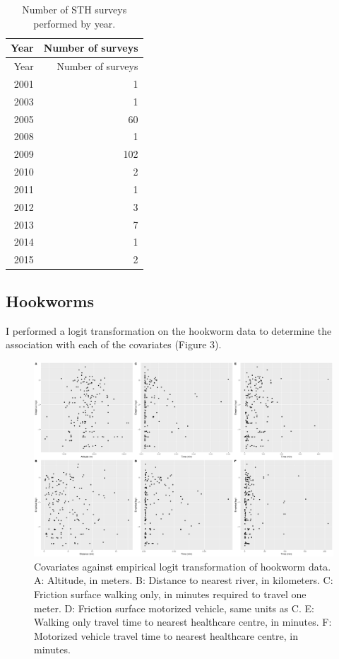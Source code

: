 \documentclass[
]{article}
\begin{document}
\begin{longtable}[]{@{}rr@{}}
\caption{Number of STH surveys performed by year.}\tabularnewline
\toprule
Year & Number of surveys \\
\midrule
\endfirsthead
\toprule
Year & Number of surveys \\
\midrule
\endhead
2001 & 1 \\
2003 & 1 \\
2005 & 60 \\
2008 & 1 \\
2009 & 102 \\
2010 & 2 \\
2011 & 1 \\
2012 & 3 \\
2013 & 7 \\
2014 & 1 \\
2015 & 2 \\
\bottomrule
\end{longtable}

\hypertarget{hookworms}{%
\subsection{Hookworms}\label{hookworms}}

I performed a logit transformation on the hookworm data to determine the
association with each of the covariates (Figure 3).

\begin{figure}
\centering
\includegraphics{write_up_files/figure-latex/HK_e.logit-1.pdf}
\caption{Covariates against empirical logit transformation of hookworm
data. A: Altitude, in meters. B: Distance to nearest river, in
kilometers. C: Friction surface walking only, in minutes required to
travel one meter. D: Friction surface motorized vehicle, same units as
C. E: Walking only travel time to nearest healthcare centre, in minutes.
F: Motorized vehicle travel time to nearest healthcare centre, in
minutes.}
\end{figure}
\end{document}
